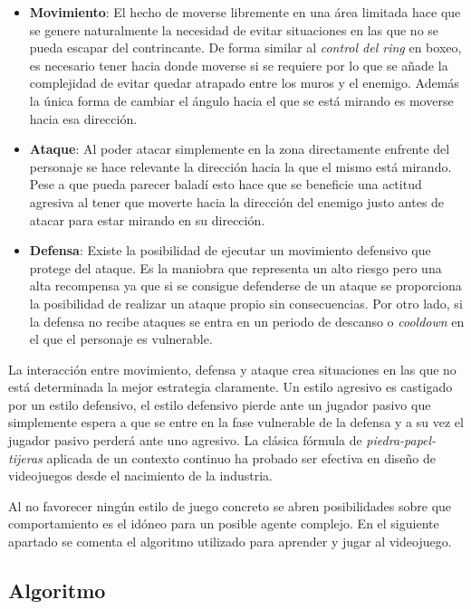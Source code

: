\begin{itemize}
	\item \textbf{Movimiento}: El hecho de moverse libremente en una área limitada hace que se genere naturalmente la necesidad de evitar situaciones en las que no se pueda escapar del contrincante. De forma similar al \textit{control del ring} en boxeo, es necesario tener hacia donde moverse si se requiere por lo que se añade la complejidad de evitar quedar atrapado entre los muros y el enemigo. Además la única forma de cambiar el ángulo hacia el que se está mirando es moverse hacia esa dirección.
	\item \textbf{Ataque}: Al poder atacar simplemente en la zona directamente enfrente del personaje se hace relevante la dirección hacia la que el mismo está mirando. Pese a que pueda parecer baladí esto hace que se beneficie una actitud agresiva al tener que moverte hacia la dirección del enemigo justo antes de atacar para estar mirando en su dirección.
	\item \textbf{Defensa}: Existe la posibilidad de ejecutar un movimiento defensivo que protege del ataque. Es la maniobra que representa un alto riesgo pero una alta recompensa ya que si se consigue defenderse de un ataque se proporciona la posibilidad de realizar un ataque propio sin consecuencias. Por otro lado, si la defensa no recibe ataques se entra en un periodo de descanso o \textit{cooldown} en el que el personaje es vulnerable.
\end{itemize}

\bigskip

La interacción entre movimiento, defensa y ataque crea situaciones en las que no está determinada la mejor estrategia claramente. Un estilo agresivo es castigado por un estilo defensivo, el estilo defensivo pierde ante un jugador pasivo que simplemente espera a que se entre en la fase vulnerable de la defensa y a su vez el jugador pasivo perderá ante uno agresivo. La clásica fórmula de \textit{piedra-papel-tijeras} aplicada de un contexto continuo ha probado ser efectiva en diseño de videojuegos desde el nacimiento de la industria.

\bigskip

Al no favorecer ningún estilo de juego concreto se abren posibilidades sobre que comportamiento es el idóneo para un posible agente complejo. En el siguiente apartado se comenta el algoritmo utilizado para aprender y jugar al videojuego.

\subsection{Algoritmo}

